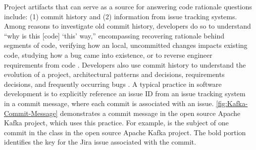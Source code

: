 Project artifacts that can serve as a source for answering code rationale questions include: (1) commit history and (2) information from issue tracking systems. 
Among reasons to investigate old commit history, developers do so to understand ``why is this [code] ‘this’ way,'' encompassing recovering rationale behind segments of code, verifying how an local, uncommitted changes impacts existing code, studying how a bug came into existence, or to reverse engineer requirements from code \cite{codoban_software_2015}. 
Developers also use commit history to understand the evolution of a project, \eg  architectural patterns and decisions, requirements decisions, and frequently occurring bugs \cite{codoban_software_2015}.
A typical practice in software development is to explicitly reference an issue ID from an issue tracking system in a commit message, where each commit is associated with an issue. \autoref{fig:Kafka-Commit-Message} demonstrates a commit message in the open source Apache Kafka project, which uses this practice. For example,  is the subject of one commit in the  class in the open source Apache Kafka project. The bold portion identifies the key for the Jira issue associated with the commit.

